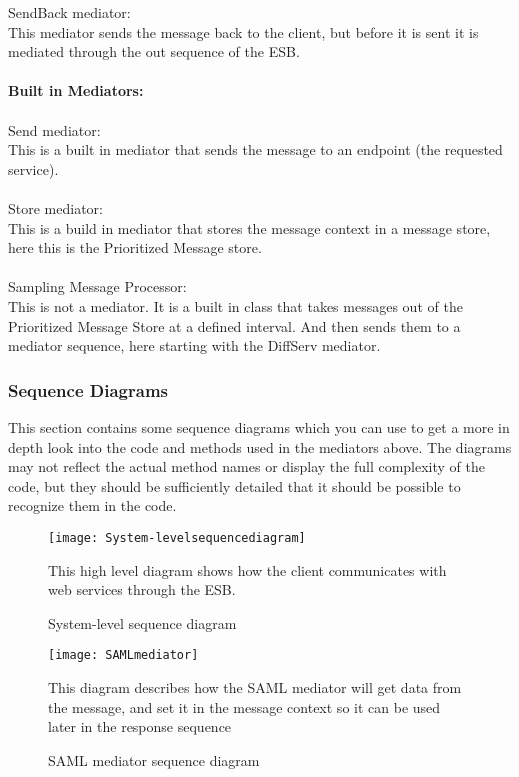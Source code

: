 SendBack mediator:\\
    This mediator sends the message back to the client, but before it is sent it is mediated through the out sequence of the ESB.
\\\\
\textbf{Built in Mediators:}\\\\
Send mediator:\\
    This is a built in mediator that sends the message to an endpoint (the requested service).
\\\\
Store mediator:\\
    This is a build in mediator that stores the message context in a message store, here this is the Prioritized Message store.
\\\\
Sampling Message Processor:\\
    This is not a mediator. It is a built in class that takes messages out of the Prioritized Message Store at a defined interval. And then sends them to a mediator sequence, here starting with the DiffServ mediator.

    \subsubsection{Sequence Diagrams}\label{Server Sequence Diagrams}
    This section contains some sequence diagrams which you can use to get a more in depth look into the code and methods used in the mediators above. The diagrams may not reflect the actual method names or display the full complexity of the code, but they should be sufficiently detailed that it should be possible to recognize them in the code.
    
        \begin{figure}[H]
            \centering
            \texttt{[image: System-levelsequencediagram]}
            \caption{System-level sequence diagram}
            This high level diagram shows how the client communicates with web services through the ESB.
            \label{fig:System-levelsequencediagram}
        \end{figure}
        
        \begin{figure}[H] 
            \centering
            \texttt{[image: SAMLmediator]}
            \caption{SAML mediator sequence diagram}
            This diagram describes how the SAML mediator will get data from the message, and set it in the message context so it can be used later in the response sequence
            \label{fig:SAMLmediator}
        \end{figure}
        
